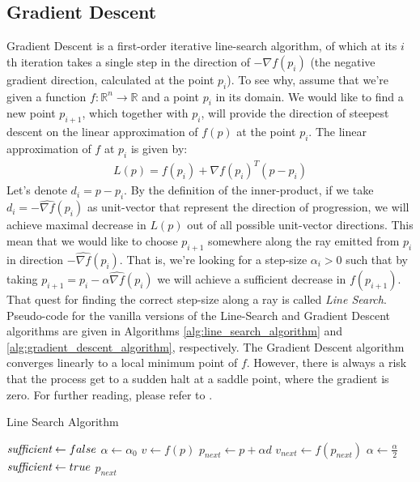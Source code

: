 \subsection{Gradient Descent}
Gradient Descent is a first-order iterative line-search algorithm, of which at its $i$th iteration takes a single step in the direction of $-\nabla f\left(p_i\right)$ (the negative gradient direction, calculated at the point $p_i$). To see why, assume that we're given a function $f:\mathbb{R}^n\rightarrow\mathbb{R}$ and a point $p_i$ in its domain. We would like to find a new point $p_{i+1}$, which together with $p_i$, will provide the direction of steepest descent on the linear approximation of $f(p)$ at the point $p_i$. The linear approximation of $f$ at $p_i$ is given by:
\begin{equation}
\label{vectorized_quadratic_approx_p}
\begin{split}
L\left(p\right) = f\left(p_i\right) + \nabla f\left(p_i\right)^T\left(p-p_i\right)
\end{split}
\end{equation}
Let's denote $d_i = p-p_i$. By the definition of the inner-product, if we take $d_i = -\widehat{\nabla f}\left(p_i\right)$ as unit-vector that represent the direction of progression, we will achieve maximal decrease in $L\left(p\right)$ out of all possible unit-vector directions. This mean that we would like to choose $p_{i+1}$ somewhere along the ray emitted from $p_i$ in direction $-\widehat{\nabla f}\left(p_i\right)$. That is, we're looking for a step-size $\alpha_i>0$ such that by  taking $p_{i+1}=p_i - \alpha \widehat{\nabla f}\left(p_i\right)$ we will achieve a sufficient decrease in $f\left(p_{i+1}\right)$. That quest for finding the correct step-size along a ray is called \emph{Line Search}.
Pseudo-code for the vanilla versions of the Line-Search and Gradient Descent algorithms are given in Algorithms \ref{alg:line_search_algorithm} and \ref{alg:gradient_descent_algorithm}, respectively. The Gradient Descent algorithm converges linearly to a local minimum point of $f$. However, there is always a risk that the process get to a sudden halt at a saddle point, where the gradient is zero. For further reading, please refer to \cite{Nocedal2006Numerical}.
\begin{algorithm}[ht]
  \caption{Line Search Algorithm}
  \label{alg:line_search_algorithm}
  \begin{algorithmic}[1]
    \State $\emph{sufficient} \leftarrow false$
    \State $\alpha \leftarrow \alpha_0$
    \State $v \leftarrow f\left(p\right)$
    \Repeat
        \State $p_{next} \leftarrow p + \alpha d$
        \State $v_{next} \leftarrow f\left(p_{next}\right)$
        \State $\alpha \leftarrow \frac{\alpha}{2}$
            \State $\emph{sufficient} \leftarrow true$
        \EndIf
    \State \Return $p_{next}$
    \EndFunction
  \end{algorithmic}
\end{algorithm}
